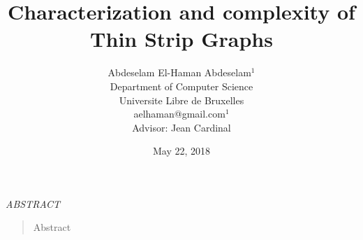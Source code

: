 \documentclass[12pt]{article}
\title{Characterization and complexity of Thin Strip Graphs}
\author{Abdeselam El-Haman Abdeselam$^1$  \\  Department of Computer
Science \\ Universite Libre de Bruxelles\\ {\small aelhaman@gmail.com$^1$}\\[0.5cm]{\small Advisor:
Jean Cardinal}}
\date{May 22, 2018}
\begin{document}
  \maketitle




\begin{center} {\sl ABSTRACT} \end{center}

\begin{quotation}

Abstract

\end{quotation}







\end{document}
